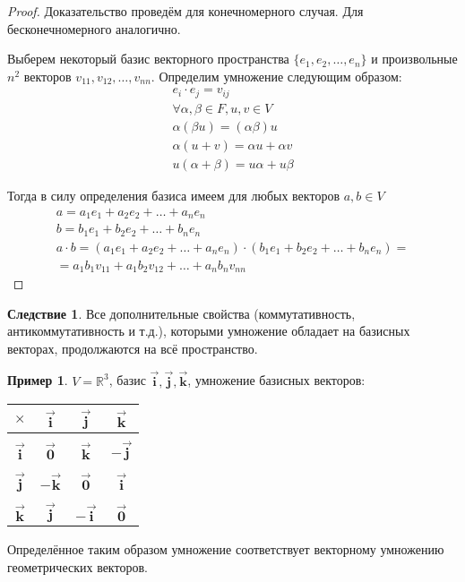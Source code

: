 \documentclass[12pt]{extarticle}
\theoremstyle{definition}
\newtheorem*{example}{\indent Пример}%
\newtheorem*{corollary*}{\indent Следствие}
\newcommand{\RR}{\mathbb{R}}
\begin{document}
    \begin{proof}
        Доказательство проведём для конечномерного случая. Для бесконечномерного аналогично.

        Выберем некоторый базис векторного пространства $\{e_1,e_2,\dots,e_n\}$ и произвольные $n^2$ векторов $v_{11}, v_{12}, \dots, v_{nn}$. Определим умножение следующим образом:
        \begin{gather*}
            e_i\cdot e_j = v_{ij}\\
            \forall \alpha,\beta\in F, u,v\in V\\
            \alpha(\beta u) = (\alpha\beta)u\\
            \alpha(u + v)=\alpha u + \alpha v\\
            u(\alpha+\beta)=u\alpha+u\beta
        \end{gather*}

        Тогда в силу определения базиса имеем для любых векторов $a,b\in V$
        \begin{gather*}
            a=a_1e_1+a_2e_2+\dots+a_ne_n\\
            b=b_1e_1+b_2e_2+\dots+b_ne_n\\
            a\cdot b= (a_1e_1+a_2e_2+\dots+a_ne_n)\cdot(b_1e_1+b_2e_2+\dots+b_ne_n)=\\
            =a_1b_1v_{11}+a_1b_2v_{12}+\dots+a_nb_nv_{nn}
        \end{gather*}
    \end{proof}
    \begin{corollary*}
        Все дополнительные свойства (коммутативность, антикоммутативность и т.д.), которыми умножение обладает на базисных векторах, продолжаются на всё пространство.
    \end{corollary*}
    \begin{example}
        $V = \RR^3$, базис $\symbf{\vec i,\vec j,\vec k}$, умножение базисных векторов:
        \begin{center}
            \begin{tabular}{c|c|c|c}
                $\times$ & $\vec{\symbf i}$ & $\vec{\symbf j}$ & $\vec{\symbf k}$\\
                \hline
                &&&\\[-1em]
                $\vec{\symbf i}$ & $\vec{\symbf 0}$ & $\vec{\symbf k}$ & $-\vec{\symbf j}$\\
                \hline
                &&&\\[-1em]
                $\vec{\symbf j}$ & $-\vec{\symbf k}$& $\vec{\symbf 0}$ & $\vec{\symbf i}$\\
                \hline
                &&&\\[-1em]
                $\vec{\symbf k}$ & $\vec{\symbf j}$ & $-\vec{\symbf i}$& $\vec{\symbf 0}$
            \end{tabular}
        \end{center}

        Определённое таким образом умножение соответствует векторному умножению геометрических векторов.
    \end{example}
\end{document}
